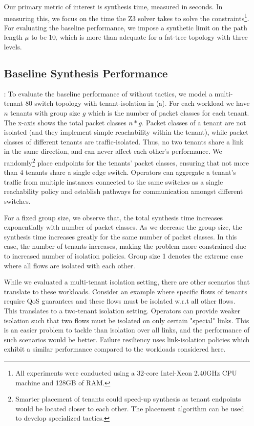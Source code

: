 Our primary metric of interest is synthesis time, measured in
seconds. In measuring this, we focus on the time the Z3 solver takes
to solve the constraints\footnote{All experiments were conducted using a
	32-core Intel-Xeon 2.40GHz CPU machine and
	128GB of RAM.}. For evaluating the baseline performance, we impose a
synthetic limit on the path length $\mu$ to be $10$, which is more than adequate 
for a fat-tree topology with three levels. 

\subsection{Baseline Synthesis Performance} \label{sec:baselineeval} 
: To evaluate the baseline
performance of \Name without tactics, we model a multi-tenant 80 switch
 topology with tenant-isolation in
(a).  For each workload we have $n$ tenants with
group size $g$ which is the number of packet classes for each
tenant. The x-axis shows the total packet classes $n*g$.  Packet
classes of a tenant are not isolated (and they implement simple
reachability within the tenant), while packet classes of different
tenants are traffic-isolated. Thus, no two tenants share a link in
the same direction, and can never
affect each other's performance.  We randomly\footnote{ Smarter
  placement of tenants could speed-up synthesis as tenant endpoints
  would be located closer to each other. The placement algorithm can
  be used to develop specialized tactics.}  place endpoints for the
tenants' packet classes, ensuring that not more than 4 tenants share a
single edge switch.  Operators can aggregate a tenant's traffic from
multiple instances connected to the same switches 
as a single reachability policy and establish
pathways for communication amongst different switches.

For a fixed group size, we observe that, the total synthesis time
increases exponentially with number of packet classes.  As we
decrease the group size, the synthesis time increases
greatly for the same number of packet classes.  In this case, the
number of tenants increases, making the problem more constrained due
to increased number of isolation policies.  Group size 1 denotes the
extreme case where all flows are isolated with each other.
 
While we evaluated a multi-tenant isolation setting, there are other
scenarios that translate to these workloads. Consider an example where
specific flows of tenants require QoS guarantees and these flows must
be isolated w.r.t all other flows. This translates to a two-tenant
isolation setting. Operators can provide weaker isolation such that
two flows must be isolated on only certain "special" links. 
This is an easier problem to tackle than isolation over all
links, and the performance of such scenarios would be better. 
Failure resiliency uses link-isolation policies which exhibit a similar
performance compared to the workloads considered here. 

